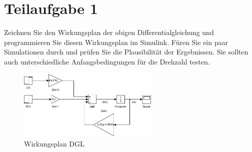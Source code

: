 \section{Teilaufgabe 1}
\begin{aufgabe}
Zeichnen Sie den Wirkungsplan der obigen Differentialgleichung und 
programmieren Sie diesen Wirkungsplan im Simulink. Füren Sie ein paar 
Simulationen durch und prüfen Sie die Plausibilität der Ergebnissen. Sie 
sollten auch unterschiedliche Anfangsbedingungen für die Drehzahl testen.
\end{aufgabe}
\begin{figure}[h!]
    \centering
    \includegraphics[width=0.6\textwidth]{01/wirkungsplan.pdf}
    \caption{Wirkungsplan DGL}
    \label{fig:01}
\end{figure}
